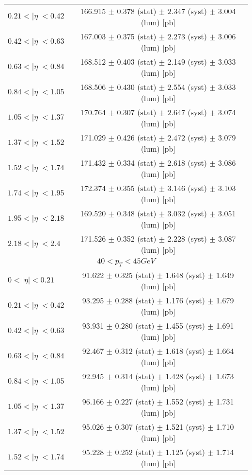 \begin{tabular}{lc}
$0.21 < |\eta| <0.42$          & 166.915 $\pm$ 0.378 (stat) $\pm$ 2.347 (syst) $\pm$ 3.004 (lum) [pb]  \\
$0.42 < |\eta| <0.63$          & 167.003 $\pm$ 0.375 (stat) $\pm$ 2.273 (syst) $\pm$ 3.006 (lum) [pb]  \\
$0.63 < |\eta| <0.84$          & 168.512 $\pm$ 0.403 (stat) $\pm$ 2.149 (syst) $\pm$ 3.033 (lum) [pb]  \\
$0.84 < |\eta| <1.05$          & 168.506 $\pm$ 0.430 (stat) $\pm$ 2.554 (syst) $\pm$ 3.033 (lum) [pb]  \\
$1.05 < |\eta| <1.37$          & 170.764 $\pm$ 0.307 (stat) $\pm$ 2.647 (syst) $\pm$ 3.074 (lum) [pb]  \\
$1.37 < |\eta| <1.52$          & 171.029 $\pm$ 0.426 (stat) $\pm$ 2.472 (syst) $\pm$ 3.079 (lum) [pb]  \\
$1.52 < |\eta| <1.74$          & 171.432 $\pm$ 0.334 (stat) $\pm$ 2.618 (syst) $\pm$ 3.086 (lum) [pb]  \\
$1.74 < |\eta| <1.95$          & 172.374 $\pm$ 0.355 (stat) $\pm$ 3.146 (syst) $\pm$ 3.103 (lum) [pb]  \\
$1.95 < |\eta| <2.18$          & 169.520 $\pm$ 0.348 (stat) $\pm$ 3.032 (syst) $\pm$ 3.051 (lum) [pb]  \\
$2.18 < |\eta| <2.4$           & 171.526 $\pm$ 0.352 (stat) $\pm$ 2.228 (syst) $\pm$ 3.087 (lum) [pb]  \\
\hline
\multicolumn{2}{c}{$40 < p_{T} < 45 GeV$} \\
\hline
$0 < |\eta| <0.21$             & 91.622 $\pm$ 0.325 (stat) $\pm$ 1.648 (syst) $\pm$ 1.649 (lum) [pb]  \\
$0.21 < |\eta| <0.42$          & 93.295 $\pm$ 0.288 (stat) $\pm$ 1.176 (syst) $\pm$ 1.679 (lum) [pb]  \\
$0.42 < |\eta| <0.63$          & 93.931 $\pm$ 0.280 (stat) $\pm$ 1.455 (syst) $\pm$ 1.691 (lum) [pb]  \\
$0.63 < |\eta| <0.84$          & 92.467 $\pm$ 0.312 (stat) $\pm$ 1.618 (syst) $\pm$ 1.664 (lum) [pb]  \\
$0.84 < |\eta| <1.05$          & 92.945 $\pm$ 0.314 (stat) $\pm$ 1.428 (syst) $\pm$ 1.673 (lum) [pb]  \\
$1.05 < |\eta| <1.37$          & 96.166 $\pm$ 0.227 (stat) $\pm$ 1.552 (syst) $\pm$ 1.731 (lum) [pb]  \\
$1.37 < |\eta| <1.52$          & 95.026 $\pm$ 0.307 (stat) $\pm$ 1.521 (syst) $\pm$ 1.710 (lum) [pb]  \\
$1.52 < |\eta| <1.74$          & 95.228 $\pm$ 0.252 (stat) $\pm$ 1.125 (syst) $\pm$ 1.714 (lum) [pb]  \\

\end{tabular}
